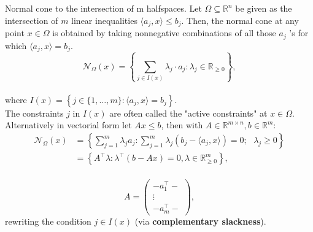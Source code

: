 
\begin{theorem}[L3.1,L5.3]{Normal cone to the intersection of m halfspaces.}
    Let $\Omega \subseteq \mathbb{R}^n$ be given as the intersection of $m$ linear inequalities $\langle a_j, x\rangle \leq b_j$. Then, the normal cone at any point $x \in \Omega$ is obtained by taking nonnegative combinations of all those $a_j$ 's for which $\langle a_j, x\rangle=b_j$. 
    \vspace{-4pt}\\
    $$
    \mathcal{N}_{\Omega}(x)=\left\{\sum_{j \in I(x)} \lambda_j \cdot a_j: \lambda_j \in \mathbb{R}_{\geq 0}\right\},
    $$ 
    \vspace{-4pt}\\
    where $I(x)=\left\{j \in\{1, \ldots, m\}:\langle a_j, x\rangle=b_j\right\}$.\\
    The constraints $j$ in $I(x)$ are often called the "active constraints" at $x \in \Omega$.
    Alternatively in vectorial form let $Ax \leq b$, then with $A\in \mathbb{R}^{m \times n}, b \in \mathbb{R}^m$:
    \vspace{-4pt}\\
    {\footnotesize$$
    \begin{aligned}
        \mathcal{N}_{\Omega}(x) &= \left\{\sum_{j=1}^{m} \lambda_j a_j : \sum_{j=1}^{m} \lambda_j  \left(b_j - \langle a_j, x \rangle \right) = 0 ;\text{ } \lambda_j \geq 0 \right\}\\
        &= \left\{A^{\top} \lambda: \lambda^{\top}(b-A x)=0, \lambda \in \mathbb{R}_{\geq 0}^m\right\},
    \end{aligned}
    $$
    \vspace{-10pt}\\
    $$
    A=\left(\begin{array}{c}
        -a_1^{\top}- \\
        \vdots \\
        -a_m^{\top}-
        \end{array}\right),
    $$}
    rewriting the condition $j \in I(x)$ (via \textbf{complementary slackness}).
\end{theorem}

